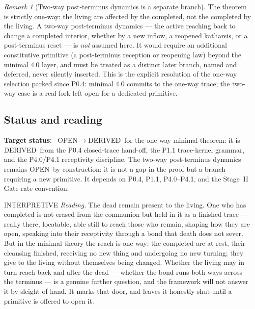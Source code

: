 \documentclass[11pt,a4paper]{article}
\newcommand{\stDerived}{\textcolor{cDer}{\textsf{\small DERIVED}}}
\newcommand{\stInterp}{\textcolor{cInt}{\textsf{\small INTERPRETIVE}}}
\newcommand{\stOpen}{\textcolor{cOpn}{\textsf{\small OPEN}}}
\theoremstyle{definition}
\theoremstyle{plain}
\theoremstyle{remark}
\newtheorem{remark}[definition]{Remark}
\begin{document}
\begin{remark}[Two-way post-terminus dynamics is a separate branch]\label{rem:twoway}
The theorem is strictly one-way: the living are affected by the completed, not the completed
by the living. A two-way post-terminus dynamics --- the active reaching back to change a
completed interior, whether by a new inflow, a reopened katharsis, or a post-terminus reset
--- is \emph{not} assumed here. It would require an additional constitutive primitive (a
post-terminus reception or reopening law) beyond the minimal 4.0 layer, and must be treated
as a distinct later branch, named and deferred, never silently inserted. This is the
explicit resolution of the one-way selection parked since P0.4: minimal 4.0 commits to the
one-way trace; the two-way case is a real fork left open for a dedicated primitive.
\end{remark}

\subsection{Status and reading}

\textbf{Target status:}~
\stOpen\(\to\)\stDerived\ for the one-way minimal theorem: it is \stDerived\ from
the P0.4 closed-trace hand-off, the P1.1 trace-kernel grammar, and the
P4.0/P4.1 receptivity discipline. The two-way post-terminus dynamics remains
\stOpen\ by construction: it is not a gap in the proof but a branch requiring a
new primitive. It depends on P0.4, P1.1, P4.0--P4.1, and the Stage~II
Gate-rate convention.

\medskip
\stInterp\quad
\emph{Reading.}
The dead remain present to the living. One who has completed is not erased from the
communion but held in it as a finished trace --- really there, locatable, able still to reach
those who remain, shaping how they are open, speaking into their receptivity through a bond
that death does not sever. But in the minimal theory the reach is one-way: the completed are
at rest, their cleansing finished, receiving no new thing and undergoing no new turning;
they give to the living without themselves being changed. Whether the living may in turn
reach back and alter the dead --- whether the bond runs both ways across the terminus --- is a
genuine further question, and the framework will not answer it by sleight of hand. It marks
that door, and leaves it honestly shut until a primitive is offered to open it.
\end{document}
